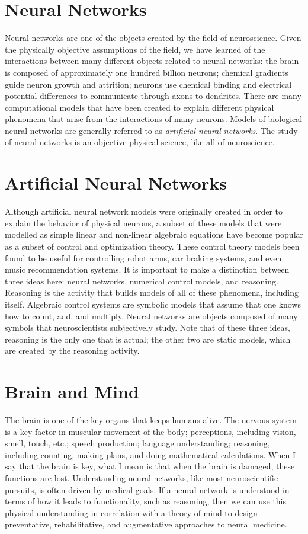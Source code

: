 \section{Neural Networks}

Neural networks are one of the objects created by the field of
neuroscience.  Given the physically objective assumptions of the
field, we have learned of the interactions between many different
objects related to neural networks: the brain is composed of
approximately one hundred billion neurons; chemical gradients guide
neuron growth and attrition; neurons use chemical binding and
electrical potential differences to communicate through axons to
dendrites.  There are many computational models that have been created
to explain different physical phenomena that arise from the
interactions of many neurons.  Models of biological neural networks
are generally referred to as \emph{artificial neural networks}.  The
study of neural networks is an objective physical science, like all of
neuroscience.

\section{Artificial Neural Networks}

Although artificial neural network models were originally created in
order to explain the behavior of physical neurons, a subset of these
models that were modelled as simple linear and non-linear algebraic
equations have become popular as a subset of control and optimization
theory.  These control theory models been found to be useful for
controlling robot arms, car braking systems, and even music
recommendation systems.  It is important to make a distinction between
three ideas here: neural networks, numerical control models, and
reasoning.  Reasoning is the activity that builds models of all of
these phenomena, including itself.  Algebraic control systems are
symbolic models that assume that one knows how to count, add, and
multiply.  Neural networks are objects composed of many symbols that
neuroscientists subjectively study.  Note that of these three ideas,
reasoning is the only one that is actual; the other two are static
models, which are created by the reasoning activity.

\section{Brain and Mind}

The brain is one of the key organs that keeps humans alive.  The
nervous system is a key factor in muscular movement of the body;
perceptions, including vision, smell, touch, etc.; speech production;
language understanding; reasoning, including counting, making plans,
and doing mathematical calculations.  When I say that the brain is
key, what I mean is that when the brain is damaged, these functions
are lost.  Understanding neural networks, like most neuroscientific
pursuits, is often driven by medical goals.  If a neural network is
understood in terms of how it leads to functionality, such as
reasoning, then we can use this physical understanding in correlation
with a theory of mind to design preventative, rehabilitative, and
augmentative approaches to neural medicine.

